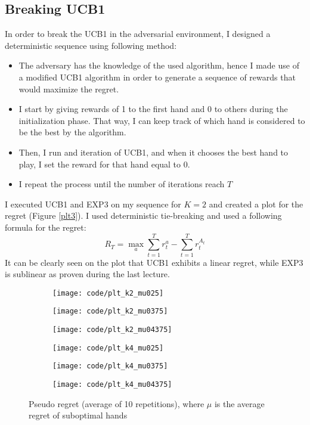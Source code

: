 \documentclass[a4paper]{article}
\begin{document}
\subsection{Breaking UCB1}
In order to break the UCB1 in the adversarial environment, I designed a
deterministic sequence using following method:
\begin{itemize}
\item The adversary has the knowledge of the used algorithm, hence I made use of
  a modified UCB1 algorithm in order to generate a sequence of rewards that
  would maximize the regret. 
\item I start by giving rewards of 1 to the first hand and 0 to others during the
  initialization phase. That way, I can keep track of  which hand is considered to be
  the best by the algorithm.
\item Then, I run and iteration of UCB1, and when it chooses the best hand to
  play, I set the reward for that hand equal to 0.
\item I repeat the process until the number of iterations reach $T$ 
\end{itemize}
I executed UCB1 and EXP3 on my sequence for $K=2$ and created a plot for the
regret (Figure \ref{plt3}). I used deterministic tie-breaking and used a
following formula for the regret:
\[
R_{T}=
\max _{a} \sum_{t=1}^{T} r_{t}^{a}-
\sum_{t=1}^{T} r_{t}^{A_{t}}
\]
It can be clearly seen on the plot that UCB1 exhibits a linear regret, while
EXP3 is sublinear as proven during the last lecture.
\begin{figure}
  \centering
  \begin{subfigure}[b]{0.49\textwidth}
    \centering
    \texttt{[image: code/plt\_k2\_mu025]}
  \end{subfigure}
  \begin{subfigure}[b]{0.49\textwidth}
    \centering
    \texttt{[image: code/plt\_k2\_mu0375]}
  \end{subfigure}
  \begin{subfigure}[b]{0.49\textwidth}
    \centering
    \texttt{[image: code/plt\_k2\_mu04375]}
  \end{subfigure}
  \begin{subfigure}[b]{0.49\textwidth}
    \centering
    \texttt{[image: code/plt\_k4\_mu025]}
  \end{subfigure}
  \begin{subfigure}[b]{0.49\textwidth}
    \centering
    \texttt{[image: code/plt\_k4\_mu0375]}
  \end{subfigure}
  \begin{subfigure}[b]{0.49\textwidth}
    \centering
    \texttt{[image: code/plt\_k4\_mu04375]}
  \end{subfigure}
  \caption{Pseudo regret (average of 10 repetitions), where $\mu$ is the average
    regret of suboptimal hands}
  \label{plt1}
\end{figure}
\end{document}
